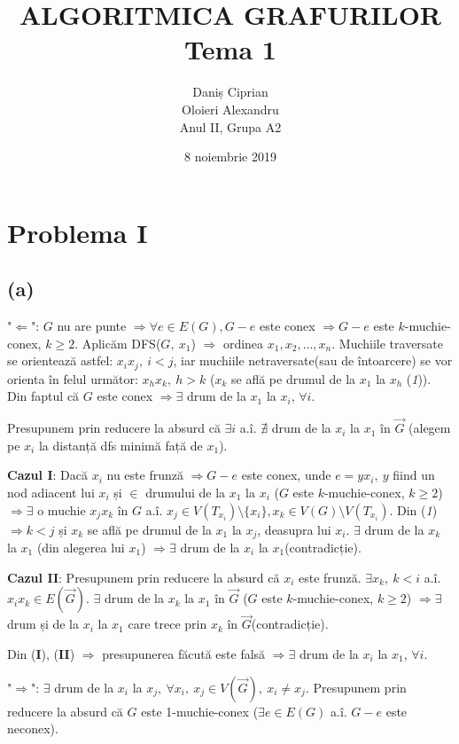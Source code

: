 \documentclass[a4paper,12pt]{article}
\title{ALGORITMICA GRAFURILOR \\
		Tema 1}
\author{Daniș Ciprian\\
		Oloieri Alexandru \\
		Anul II, Grupa A2}
\date{8 noiembrie 2019}
\begin{document}
	
\maketitle
	
\section{Problema I}

\subsection{(a)}

"$\Leftarrow$":  $G$ nu are punte $\Rightarrow \forall e \in E(G), G-e$ este conex $\Rightarrow G-e$ este $k$-muchie-conex, $k\geq2$.
Aplicăm DFS($G,\ x_1$) $\Rightarrow$ ordinea $x_1,x_2,\ldots,x_n$. Muchiile traversate se orientează astfel: $x_ix_j,\ i<j$, iar muchiile netraversate(sau de întoarcere) se vor orienta în felul următor: $x_hx_k,\ h>k$ ($x_k$ se află pe drumul de la $x_1$ la $x_h$ ({\itshape1})).
Din faptul că $G$ este conex $\Rightarrow \exists$ drum de la $x_1$ la $x_i$, $\forall i$.

Presupunem prin reducere la absurd că $\exists i$ a.î. $\nexists$ drum de la $x_i$ la $x_1$ în $\overrightarrow{G}$ (alegem pe $x_i$ la distanță dfs minimă față de $x_1$).

\textbf{Cazul I}: Dacă $x_i$ nu este frunză $\Rightarrow G-e$ este conex, unde $e=yx_i,\ y$ fiind un nod adiacent lui $x_i$ și $\in$ drumului de la $x_1$ la $x_i$ ($G$ este $k$-muchie-conex, $k\geq2$) $\Rightarrow \exists$ o muchie $x_jx_k$ în $G$ a.î. $x_j \in V(T_{x_i}) \setminus \{x_i\}, x_k \in V(G) \setminus V(T_{x_i})$. Din ({\itshape1}) $\Rightarrow k<j$ și $x_k$ se află pe drumul de la $x_1$ la $x_j$, deasupra lui $x_i$. $\exists$ drum de la $x_k$ la $x_1$ (din alegerea lui $x_1$) $\Rightarrow \exists$ drum de la $x_i$ la $x_1$(contradicție).

\textbf{Cazul II}: Presupunem prin reducere la absurd că $x_i$ este frunză. $\exists x_k,\ k<i$ a.î. $x_ix_k \in E(\overrightarrow{G})$. $\exists$ drum de la $x_k$ la $x_1$ în $\overrightarrow{G}$ ($G$ este $k$-muchie-conex, $k\geq2$) $\Rightarrow \exists$ drum și de la $x_i$ la $x_1$ care trece prin $x_k$ în $\overrightarrow{G}$(contradicție).

Din (\textbf{I}), (\textbf{II}) $\Rightarrow$ presupunerea făcută este falsă $\Rightarrow \exists$ drum de la $x_i$ la $x_1$, $\forall i$.

"$\Rightarrow$": $\exists$ drum de la $x_i$ la $x_j,\ \forall x_i,\ x_j \in V(\overrightarrow{G}),\ x_i\neq x_j$.\newline
Presupunem prin reducere la absurd că $G$ este 1-muchie-conex ($\exists e \in E(G)$ a.î. $G-e$ este neconex).
\end{document}
